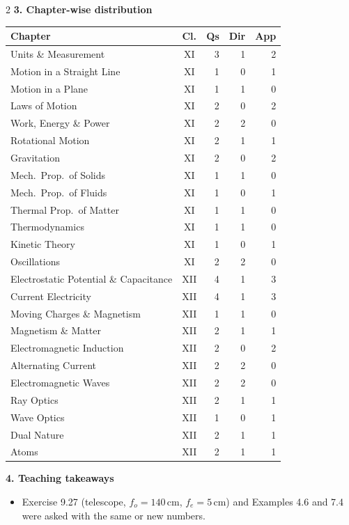 \begin{multicols}{2}
\columnbreak
\textbf{\color{crimson}3. Chapter-wise distribution}\par\smallskip
{\footnotesize\begin{tabular}{@{}p{4.7cm}c@{\,}r@{\,}r@{\,}r@{}}\toprule
Chapter & Cl. & Qs & Dir & App\\\midrule
Units \& Measurement & XI & 3 & 1 & 2\\
Motion in a Straight Line & XI & 1 & 0 & 1\\
Motion in a Plane & XI & 1 & 1 & 0\\
Laws of Motion & XI & 2 & 0 & 2\\
Work, Energy \& Power & XI & 2 & 2 & 0\\
Rotational Motion & XI & 2 & 1 & 1\\
Gravitation & XI & 2 & 0 & 2\\
Mech.\ Prop.\ of Solids & XI & 1 & 1 & 0\\
Mech.\ Prop.\ of Fluids & XI & 1 & 0 & 1\\
Thermal Prop.\ of Matter & XI & 1 & 1 & 0\\
Thermodynamics & XI & 1 & 1 & 0\\
Kinetic Theory & XI & 1 & 0 & 1\\
Oscillations & XI & 2 & 2 & 0\\
Electrostatic Potential \& Capacitance & XII & 4 & 1 & 3\\
Current Electricity & XII & 4 & 1 & 3\\
Moving Charges \& Magnetism & XII & 1 & 1 & 0\\
Magnetism \& Matter & XII & 2 & 1 & 1\\
Electromagnetic Induction & XII & 2 & 0 & 2\\
Alternating Current & XII & 2 & 2 & 0\\
Electromagnetic Waves & XII & 2 & 2 & 0\\
Ray Optics & XII & 2 & 1 & 1\\
Wave Optics & XII & 1 & 0 & 1\\
Dual Nature & XII & 2 & 1 & 1\\
Atoms & XII & 2 & 1 & 1\\
\bottomrule\end{tabular}}\par\medskip
\textbf{\color{crimson}4. Teaching takeaways}\par\smallskip
{\footnotesize\begin{itemize}[leftmargin=1em,nosep]
\item Exercise 9.27 (telescope, $f_o=140$\,cm, $f_e=5$\,cm) and Examples 4.6 and 7.4 were asked with the same or new numbers.

\end{itemize}}
\end{multicols}

